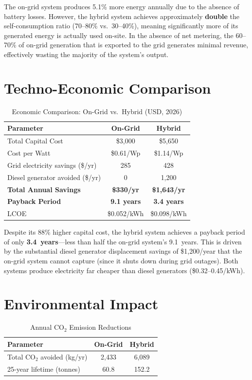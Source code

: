 The on-grid system produces 5.1\% more energy annually due to the absence of battery losses. However, the hybrid system achieves approximately \textbf{double} the self-consumption ratio (70--80\% vs.\ 30--40\%), meaning significantly more of its generated energy is actually used on-site. In the absence of net metering, the 60--70\% of on-grid generation that is exported to the grid generates minimal revenue, effectively wasting the majority of the system's output.


\section{Techno-Economic Comparison}

\begin{table}[H]
\centering
\caption{Economic Comparison: On-Grid vs.\ Hybrid (USD, 2026)}
\label{tab:short_economics}
\begin{tabular}{@{}p{5.5cm} c c@{}}
\toprule
\textbf{Parameter} & \textbf{On-Grid} & \textbf{Hybrid} \\
\midrule
Total Capital Cost & \$3,000 & \$5,650 \\
Cost per Watt & \$0.61/Wp & \$1.14/Wp \\
Grid electricity savings (\$/yr) & 285 & 428 \\
Diesel generator avoided (\$/yr) & 0 & 1,200 \\
\textbf{Total Annual Savings} & \textbf{\$330/yr} & \textbf{\$1,643/yr} \\
\textbf{Payback Period} & \textbf{9.1 years} & \textbf{3.4 years} \\
LCOE & \$0.052/kWh & \$0.098/kWh \\
\bottomrule
\end{tabular}
\end{table}

Despite its 88\% higher capital cost, the hybrid system achieves a payback period of only \textbf{3.4~years}---less than half the on-grid system's 9.1~years. This is driven by the substantial diesel generator displacement savings of \$1,200/year that the on-grid system cannot capture (since it shuts down during grid outages). Both systems produce electricity far cheaper than diesel generators (\$0.32--0.45/kWh).


\section{Environmental Impact}

\begin{table}[H]
\centering
\caption{Annual CO$_2$ Emission Reductions}
\label{tab:short_co2}
\begin{tabular}{@{}p{5.5cm} c c@{}}
\toprule
\textbf{Parameter} & \textbf{On-Grid} & \textbf{Hybrid} \\
\midrule
Total CO$_2$ avoided (kg/yr) & 2,433 & 6,089 \\
25-year lifetime (tonnes) & 60.8 & 152.2 \\
\bottomrule
\end{tabular}
\end{table}

